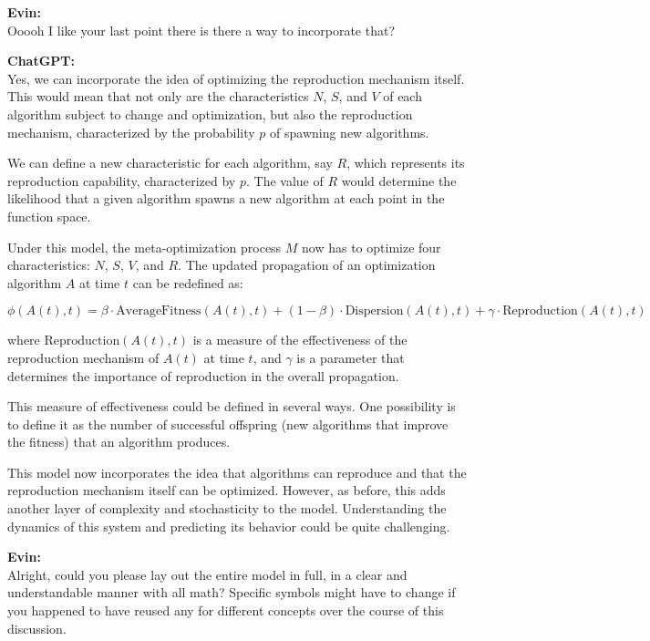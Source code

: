 \documentclass{article}[10pt]
\begin{document}
\noindent \textbf{Evin:}\\
Ooooh I like your last point there is there a way to incorporate that?\par

\noindent \textbf{ChatGPT:}\\
Yes, we can incorporate the idea of optimizing the reproduction mechanism itself. 
This would mean that not only are the characteristics \( N \), \( S \), and \( V \) of each algorithm subject to change and optimization, but also the reproduction mechanism, characterized by the probability \( p \) of spawning new algorithms.\par

We can define a new characteristic for each algorithm, say \( R \), which represents its reproduction capability, characterized by \( p \). 
The value of \( R \) would determine the likelihood that a given algorithm spawns a new algorithm at each point in the function space.\par

Under this model, the meta-optimization process \( M \) now has to optimize four characteristics: \( N \), \( S \), \( V \), and \( R \). 
The updated propagation of an optimization algorithm \( A \) at time \( t \) can be redefined as:

\[
\phi(A(t), t) = \beta \cdot \text{AverageFitness}(A(t), t) + (1 - \beta) \cdot \text{Dispersion}(A(t), t) + \gamma \cdot \text{Reproduction}(A(t), t)
\]

where \( \text{Reproduction}(A(t), t) \) is a measure of the effectiveness of the reproduction mechanism of \( A(t) \) at time \( t \), and \( \gamma \) is a parameter that determines the importance of reproduction in the overall propagation.\par

This measure of effectiveness could be defined in several ways. 
One possibility is to define it as the number of successful offspring (new algorithms that improve the fitness) that an algorithm produces.\par

This model now incorporates the idea that algorithms can reproduce and that the reproduction mechanism itself can be optimized. 
However, as before, this adds another layer of complexity and stochasticity to the model. 
Understanding the dynamics of this system and predicting its behavior could be quite challenging.\par


\noindent \textbf{Evin:}\\
Alright, could you please lay out the entire model in full, in a clear and understandable manner with all math? 
Specific symbols might have to change if you happened to have reused any for different concepts over the course of this discussion.\par
\end{document}
